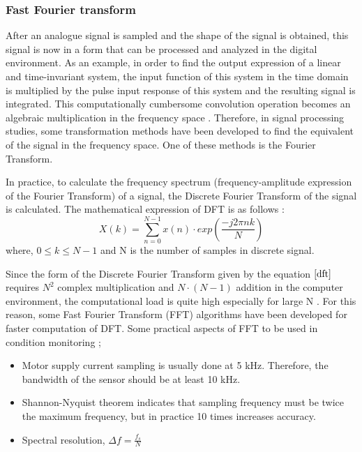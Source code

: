 \subsubsection{Fast Fourier transform}

After an analogue signal is sampled and the shape of the signal is obtained, this signal is now in a form that can be processed and analyzed in the digital environment. As an example, in order to find the output expression of a linear and time-invariant system, the input function of this system in the time domain is multiplied by the pulse input response of this system and the resulting signal is integrated. This computationally cumbersome convolution operation becomes an algebraic multiplication in the frequency space \cite{cernuda2019relevance}. Therefore, in signal processing studies, some transformation methods have been developed to find the equivalent of the signal in the frequency space. One of these methods is the Fourier Transform.

In practice, to calculate the frequency spectrum (frequency-amplitude expression of the Fourier Transform) of a signal, the Discrete Fourier Transform of the signal is calculated. The mathematical expression of DFT is as follows \cite{allen2004signal}:
\begin{equation}
X(k)= \displaystyle\sum_{n=0}^{N-1}x(n)\cdot exp\left({\frac{-j2\pi nk}{N}}\right)
\label{dft}
\end{equation}
where, $0 \leq k \leq N-1$ and N is the number of samples in discrete signal.

Since the form of the Discrete Fourier Transform given by the equation $\ref{dft}$ requires $N^2$ complex multiplication and $N\cdot (N-1)$ addition in the computer environment, the computational load is quite high especially for large N \cite{hayes2009statistical,orfanidis1995introduction,allen2004signal,randall2021vibration}. For this reason, some Fast Fourier Transform (FFT) algorithms have been developed for faster computation of DFT. Some practical aspects of FFT to be used in condition monitoring \cite{bonaldi2012predictive};

\begin{itemize}
	\item Motor supply current sampling is usually done at 5 kHz. Therefore, the bandwidth of the sensor should be at least 10 kHz.  
	\item Shannon-Nyquist theorem indicates that sampling frequency must be twice the maximum frequency, but in practice 10 times increases accuracy.
	\item Spectral resolution, $\Delta f = \displaystyle\frac{f_s}{N}$
\end{itemize}
\pagebreak

